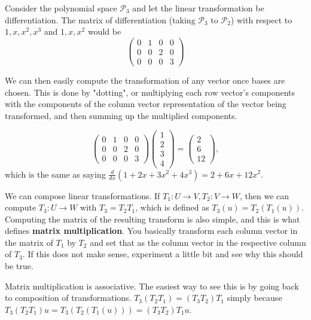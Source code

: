 \begin{ex}
Consider the polynomial space $\mathcal{P}_3$ and let the linear
transformation be differentiation. The matrix of differentiation (taking
$\mathcal{P}_3$ to $\mathcal{P}_2$) with respect to $1, x, x^2, x^3$ and
$1, x, x^2$ would be
\[ \begin{pmatrix}
0 & 1 & 0 & 0 \\
0 & 0 & 2 & 0 \\
0 & 0 & 0 & 3
\end{pmatrix} \]
\end{ex}

We can then easily compute the transformation of any vector once bases
are chosen. This is done by "dotting", or multiplying each row vector's
components with the components of the column vector representation of
the vector being transformed, and then summing up the multiplied
components.

\begin{ex}
\[ \begin{pmatrix}
0 & 1 & 0 & 0 \\
0 & 0 & 2 & 0 \\
0 & 0 & 0 & 3
\end{pmatrix} \begin{pmatrix}
1 \\ 2 \\ 3 \\ 4
\end{pmatrix} = \begin{pmatrix}
2 \\ 6 \\ 12
\end{pmatrix}, \]
which is the same as saying $\frac{d}{dx}(1 + 2x + 3x^2 + 4x^3) = 2 + 6x
+ 12x^2$.
\end{ex}

\begin{rem}
We can compose linear transformations. If $T_1 : U \rightarrow V, T_2 :
V \rightarrow W$, then we can compute $T_3 : U \rightarrow W$ with $T_3
= T_2 T_1$, which is defined as $T_3(u) = T_2(T_1(u))$. Computing the
matrix of the resulting transform is also simple, and this is what
defines \textbf{matrix multiplication}. You basically transform each
column vector in the matrix of $T_1$ by $T_2$ and set that as the column
vector in the respective column of $T_3$. If this does not make sense,
experiment a little bit and see why this should be true.
\end{rem}

\begin{rem}
Matrix multiplication is associative. The easiest way to see this is by
going back to composition of transformations. $T_3 (T_2 T_1) = (T_3 T_2)
T_1$ simply because $T_3 (T_2 T_1) u = T_3(T_2(T_1(u))) = (T_3 T_2) T_1
u$.
\end{rem}


